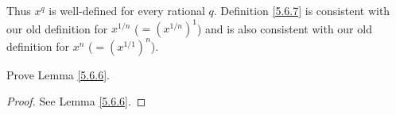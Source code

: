 \begin{note}
Thus \(x^q\) is well-defined for every rational \(q\).
Definition \ref{5.6.7} is consistent with our old definition for \(x^{1 / n}\) (\(= (x^{1 / n})^1\)) and is also consistent with our old definition for \(x^n\) (\(= (x^{1 / 1})^n\)).
\end{note}

\exercisesection

\begin{exercise}\label{ex 5.6.1}
Prove Lemma \ref{5.6.6}.
\end{exercise}

\begin{proof}
See Lemma \ref{5.6.6}.
\end{proof}